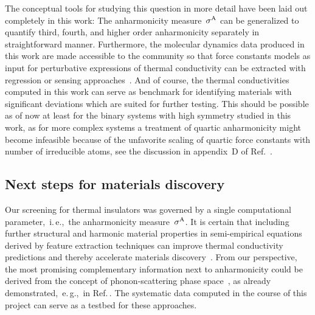 The conceptual tools for studying this question in more detail have been laid out completely in this work: The anharmonicity measure~$\sigma^\mathrm{A}$ can be generalized to quantify third, fourth, and higher order anharmonicity separately in straightforward manner. Furthermore, the molecular dynamics data produced in this work are made accessible to the community so that force constants models as input for perturbative expressions of thermal conductivity can be extracted with regression or sensing approaches~\cite{Zhou.2014,Fransson.2020}. And of course, the thermal conductivities computed in this work can serve as benchmark for identifying materials with significant deviations which are suited for further testing. This should be possible as of now at least for the binary systems with high symmetry studied in this work, as for more complex systems a treatment of quartic anharmonicity might become infeasible because of the unfavorite scaling of quartic force constants with number of irreducible atoms, see the discussion in appendix~D of Ref.~\cite{Ravichandran.2018}.

\subsection*{Next steps for materials discovery}
Our screening for thermal insulators was governed by a single computational parameter,~i.\,e.,~the anharmonicity measure~$\sigma^\mathrm{A}$. It is certain that including further structural and harmonic material properties in semi-empirical equations derived by feature extraction techniques can improve thermal conductivity predictions and thereby accelerate materials discovery~\cite{Ouyang.2018,Goldsmith.2017,Chen.2019,Purcell2021}. From our perspective, the most promising complementary information next to anharmonicity could be derived from the concept of phonon-scattering phase space~\cite{Lax.1981,Lindsay.2008,Mukhopadhyay.2016,Ravichandran.2021}, as already demonstrated,~e.\,g.,~in Ref.\,\cite{Lindsay.2008,Ravichandran.2020,Xia.2020}. 
The systematic data computed in the course of this project can serve as a testbed for these approaches.

